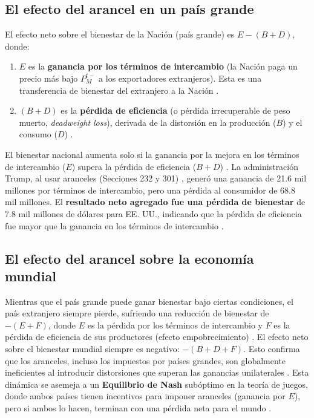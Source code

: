 \subsection{El efecto del arancel en un país grande}
El efecto neto sobre el bienestar de la Nación (país grande) es $E - (B+D)$, donde:
\begin{enumerate}
    \item $E$ es la \textbf{ganancia por los términos de intercambio} (la Nación paga un precio más bajo $P_{M}^{t-}$ a los exportadores extranjeros). Esta es una transferencia de bienestar del extranjero a la Nación .
    \item $(B+D)$ es la \textbf{pérdida de eficiencia} (o pérdida irrecuperable de peso muerto, \textit{deadweight loss}), derivada de la distorsión en la producción ($B$) y el consumo ($D$) .
\end{enumerate}
El bienestar nacional aumenta solo si la ganancia por la mejora en los términos de intercambio ($E$) supera la pérdida de eficiencia ($B+D$) . La administración Trump, al usar aranceles (Secciones 232 y 301) , generó una ganancia de 21.6 mil millones por términos de intercambio, pero una pérdida al consumidor de 68.8 mil millones. El \textbf{resultado neto agregado fue una pérdida de bienestar} de 7.8 mil millones de dólares para EE. UU., indicando que la pérdida de eficiencia fue mayor que la ganancia en los términos de intercambio .

\subsection{El efecto del arancel sobre la economía mundial}
Mientras que el país grande puede ganar bienestar bajo ciertas condiciones, el país extranjero siempre pierde, sufriendo una reducción de bienestar de $-(E+F)$, donde $E$ es la pérdida por los términos de intercambio y $F$ es la pérdida de eficiencia de sus productores (efecto empobrecimiento) .
El efecto neto sobre el bienestar mundial siempre es negativo: $-(B+D+F)$. Esto confirma que los aranceles, incluso los impuestos por países grandes, son globalmente ineficientes al introducir distorsiones que superan las ganancias unilaterales . Esta dinámica se asemeja a un \textbf{Equilibrio de Nash} subóptimo en la teoría de juegos, donde ambos países tienen incentivos para imponer aranceles (ganancia por $E$), pero si ambos lo hacen, terminan con una pérdida neta para el mundo .

